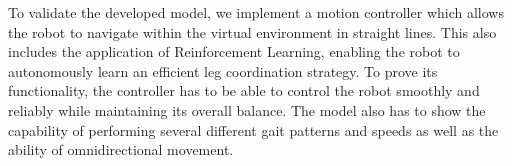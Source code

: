 To validate the developed model, we implement a motion controller which allows the robot to navigate within the virtual environment in straight lines. This also includes the application of Reinforcement Learning, enabling the robot to autonomously learn an efficient leg coordination strategy.
To prove its functionality, the controller has to be able to control the robot smoothly and reliably while maintaining its overall balance.
The model also has to show the capability of performing several different gait patterns and speeds as well as the ability of omnidirectional movement.





